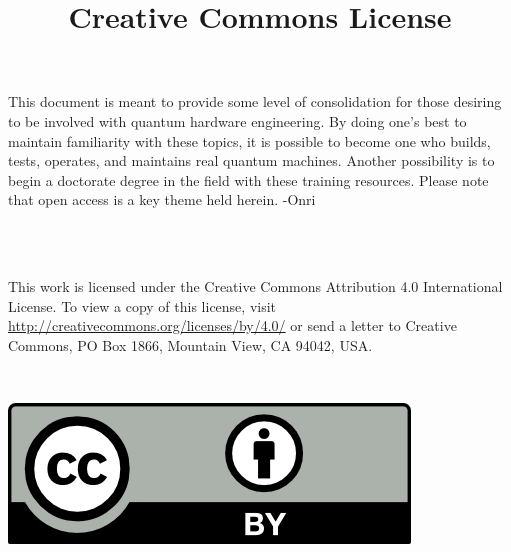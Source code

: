 \large{This document is meant to provide some level of consolidation for those desiring to be involved with quantum hardware engineering. By doing one's best to maintain familiarity with these topics, it is possible to become one who builds, tests, operates, and maintains real quantum machines. Another possibility is to begin a doctorate degree in the field with these training resources. Please note that open access is a key theme held herein. -Onri
}
\\ 
\space
\\

\begin{flushleft}
\title{\Large\textbf{Creative Commons License}}\\
\end{flushleft}
{

\large This work is licensed under the Creative Commons Attribution 4.0 International License. To view a copy of this license, visit \url{http://creativecommons.org/licenses/by/4.0/} or send a letter to Creative Commons, PO Box 1866, Mountain View, CA 94042, USA.
}\\

\begin{center}

\includegraphics{by.png}

\end{center}
